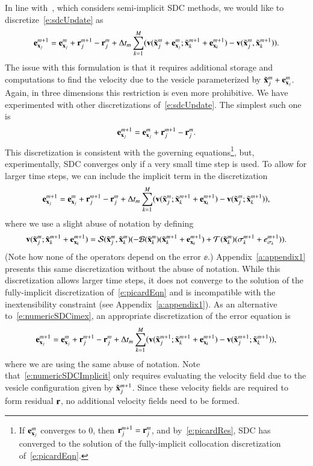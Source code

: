 In line with~\cite{min2003}, which considers semi-implicit SDC methods,
we would like to discretize~\eqref{e:sdcUpdate} as
\begin{align*}
  {\mathbf{e}}^{m+1}_{{\mathbf{x}}_{j}} = {\mathbf{e}}^{m}_{{\mathbf{x}}_{j}} + 
  {\mathbf{r}}_{j}^{m+1} - {\mathbf{r}}_{j}^{m} + 
  \Delta t_{m}\sum_{k=1}^{M}(
    {\mathbf{v}}({\tilde{{\mathbf{x}}}_{j}}^{m}+{\mathbf{e}}^{m}_{{\mathbf{x}}_{j}};{\tilde{{\mathbf{x}}}_{k}}^{m+1}+{\mathbf{e}}^{m+1}_{{\mathbf{x}}_{k}}) - 
    {\mathbf{v}}({\tilde{{\mathbf{x}}}_{j}}^{m},{\tilde{{\mathbf{x}}}_{k}}^{m+1})).
\end{align*}
The issue with this formulation is that it requires additional storage
and computations to find the velocity due to the vesicle parameterized
by ${\tilde{{\mathbf{x}}}_{j}}^{m} + {\mathbf{e}}^{m}_{{\mathbf{x}}_{j}}$.  Again, in three dimensions
this restriction is even more prohibitive.  We have experimented with
other discretizations of~\eqref{e:sdcUpdate}.  The simplest such one is
\begin{align*}
  {\mathbf{e}}^{m+1}_{{\mathbf{x}}_{j}} = {\mathbf{e}}^{m}_{{\mathbf{x}}_{j}} + 
    {\mathbf{r}}_{j}^{m+1} - {\mathbf{r}}_{j}^{m}.
\end{align*}
This discretization is consistent with the governing
equations\footnote{If ${\mathbf{e}}^{m}_{{\mathbf{x}}_{j}}$ converges to 0, then
${\mathbf{r}}_{j}^{m+1}={\mathbf{r}}_{j}^{m}$, and by~\eqref{e:picardRes}, SDC has
converged to the solution of the fully-implicit collocation
discretization of~\eqref{e:picardEqn}.}, but, experimentally, SDC
converges only if a very small time step is used.  To allow for larger
time steps, we can include the implicit term in the discretization
\begin{align}
  \label{e:numericSDCimex}
  {\mathbf{e}}^{m+1}_{{\mathbf{x}}_{j}} = {\mathbf{e}}^{m}_{{\mathbf{x}}_{j}} + 
  {\mathbf{r}}_{j}^{m+1} - {\mathbf{r}}_{j}^{m} + 
  \Delta t_{m} \sum_{k=1}^{M} 
  ({\mathbf{v}}({\tilde{{\mathbf{x}}}_{j}}^{m};{\tilde{{\mathbf{x}}}_{k}}^{m+1}+{\mathbf{e}}_{{\mathbf{x}}_{k}}^{m+1}) -
    {\mathbf{v}}({\tilde{{\mathbf{x}}}_{j}}^{m};{\tilde{{\mathbf{x}}}_{k}}^{m+1})),
\end{align}
where we use a slight abuse of notation by defining
\begin{align*}
  {\mathbf{v}}({\tilde{{\mathbf{x}}}_{j}}^{m};{\tilde{{\mathbf{x}}}_{k}}^{m+1} + {\mathbf{e}}_{{\mathbf{x}}_{k}}^{m+1}) = 
    {\mathcal{S}}({\tilde{{\mathbf{x}}}_{j}}^{m},{\tilde{{\mathbf{x}}}_{k}}^{m})
    (-{\mathcal{B}}({\tilde{{\mathbf{x}}}_{k}}^{m})({\tilde{{\mathbf{x}}}_{k}}^{m+1}+{\mathbf{e}}_{{\mathbf{x}}_{k}}^{m+1}) +
      {\mathcal{T}}({\tilde{{\mathbf{x}}}_{k}}^{m})(\sigma^{m+1}_{k} + e_{\sigma_{k}}^{m+1})).
\end{align*}
(Note how none of the operators depend on the error $\ee$.)
Appendix~\ref{a:appendix1} presents this same discretization without
the abuse of notation.  While this discretization allows larger time
steps, it does not converge to the solution of the fully-implicit
discretization of~\eqref{e:picardEqn} and is incompatible with the
inextensibility constraint (see Appendix~\ref{a:appendix1}).  As an
alternative to~\eqref{e:numericSDCimex}, an appropriate discretization
of the error equation is
\begin{align}
  \label{e:numericSDCImplicit}
  {\mathbf{e}}^{m+1}_{{\mathbf{x}}_{j}} = {\mathbf{e}}^{m}_{{\mathbf{x}}_{j}} + 
  {\mathbf{r}}_{j}^{m+1} - {\mathbf{r}}_{j}^{m} + 
  \Delta t_{m} \sum_{k=1}^{M} 
  ({\mathbf{v}}({\tilde{{\mathbf{x}}}_{j}}^{m+1};{\tilde{{\mathbf{x}}}_{k}}^{m+1}+{\mathbf{e}}_{{\mathbf{x}}_{k}}^{m+1}) -
    {\mathbf{v}}({\tilde{{\mathbf{x}}}_{j}}^{m+1};{\tilde{{\mathbf{x}}}_{k}}^{m+1})),
\end{align}
where we are using the same abuse of notation.  Note
that~\eqref{e:numericSDCImplicit} only requires evaluating the velocity
field due to the vesicle configuration given by ${\tilde{{\mathbf{x}}}_{j}}^{m+1}$.  Since
these velocity fields are required to form residual ${\mathbf{r}}$, no
additional velocity fields need to be formed.

